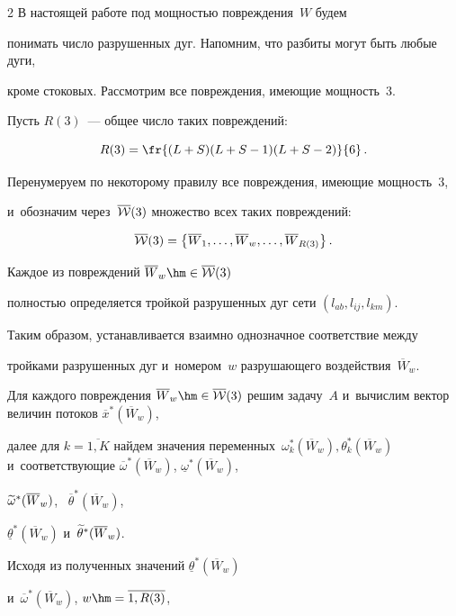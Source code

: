 \begin{multicols}{2}
В настоящей работе под мощностью повреждения~$W$ будем 


понимать число разрушенных дуг. Напомним, что разбиты могут быть любые дуги, 


кроме стоковых. Рассмотрим все повреждения, имеющие мощность~3.


Пусть $R(3)$~--- общее число таких повреждений:


$$


R(3) = \fr{(L+S) (L+S - 1) (L+S - 2)}{6}\,. 


$$


Перенумеруем по некоторому правилу все по\-вреж\-де\-ния, имеющие мощность~3, 


и~обозначим через~$\overline{\cal W}(3)$ множество  всех таких повреждений: 


$$


\overline{\cal W}(3) = \left\{ \overline W_1, \ldots, 


\overline {W}_w, \ldots, \overline {W}_{R(3)}\right\}. 


$$


Каждое из повреждений $\overline {W}_w \hm\in \overline{\cal W}(3)$ 


пол\-ностью определяется тройкой разрушенных дуг сети $(l_{ab}, l_{ij}, l_{km})$.


Таким образом, устанавливается  взаимно однозначное соответствие между 


тройками разрушенных дуг и~номером~$w$ разрушающего воздействия~$\overline {W}_w$.


Для каждого повреждения $\overline {W}_w \hm\in \overline{\cal W}(3)$ решим задачу~$A$ и~вычислим вектор величин потоков $\overline {x}^*(\overline {W}_w)$, 


далее для $k = \overline{1, K}$ найдем значения переменных~$\omega_k^*(\overline{W}_w), 


\theta_k^*(\overline{W}_w)$  и~со\-от\-вет\-ст\-ву\-ющие $\overline {\omega}^*


(\overline {W}_w)$,  $\underline{\omega}^*(\overline {W}_w)$, 


$\widetilde {\omega}^*(\overline{W}_w)$, \ $\overline {\theta}^*(\overline {W}_w)$, 


$\underline {\theta}^*(\overline {W}_w)$ и~$\widetilde {\theta}^*(\overline {W}_w)$.





Исходя из полученных значений $\underline {\theta}^*(\overline {W}_w)$ 


и~$\overline {\omega}^*(\overline {W}_w)$, $w \hm= \overline{1, R(3)}$, 



\end{multicols}
